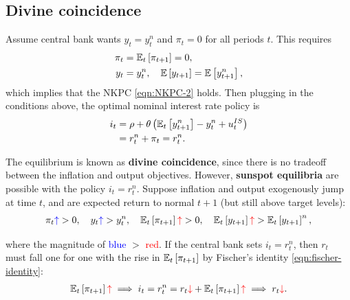 \documentclass[../main.tex]{subfiles}
\begin{document}
        
    \subsection{Divine coincidence}
    
        Assume central bank wants $y_t = y^n_t$ and $\pi_t = 0$ for all periods $t$. This requires
        \begin{align}
            \pi_t
            &= \mathbb{E}_t\left[\pi_{t+1}\right] = 0,
            \\
            y_t
            &= y_t^n, \quad \mathbb{E}\left[y_{t+1}\right] = \mathbb{E}\left[y_{t+1}^n\right],
        \end{align}
        which implies that the NKPC \eqref{eqn:NKPC-2} holds. Then plugging in the conditions above, the optimal  nominal interest rate policy is
        \begin{align}
            i_t
            &= \rho + \theta\left(\mathbb{E}_t\left[y_{t+1}^n\right] - y_t^n + u_t^{IS}\right)
            \label{eqn:divine-coincidence}
            \\
            &= r_t^n + \pi_t = r_t^n.
        \end{align}
        
        The equilibrium is known as \textbf{divine coincidence}, since there is no tradeoff between the inflation and output objectives. However, \textbf{sunspot equilibria} are possible with the policy $i_t = r_t^n$. Suppose inflation and output exogenously jump at time $t$, and are expected return to normal $t+1$ (but still above target levels):
        \newcommand{\redup}{\textcolor{red}{\uparrow}}
        \newcommand{\reddown}{\textcolor{red}{\downarrow}}
        \newcommand{\blueup}{\textcolor{blue}{\uparrow}}
        \newcommand{\bluedown}{\textcolor{blue}{\downarrow}}
        \begin{align}
            \pi_t \blueup
            > 0, \quad
            y_t
            \blueup
            > y_t^n,
            \quad
            \Et{\pi_{t+1}}
            \redup
            > 0,
            \quad
            \Et{y_{t+1}}
            \redup
            > \Et{y_{t+1}}^n,
        \end{align}
        
        where the magnitude of \textcolor{blue}{blue} $>$ 
        \textcolor{red}{red}. If the central bank sets $i_t = r_t^n$, then $r_t$ must fall one for one with the rise in $\mathbb{E}_t\left[\pi_{t+1}\right]$ by Fischer's identity \eqref{eqn:fischer-identity}:
        \begin{align}
            \Et{\pi_{t+1}}
            \redup
            \implies
            i_t = r_t^n = r_t
            \textcolor{red}{\downarrow}
            + \Et{\pi_{t+1}}
            \redup
            \implies
            r_t \textcolor{red}{\downarrow}.
            \label{eqn:sunspot-real-interest}
        \end{align}
        
\end{document}
